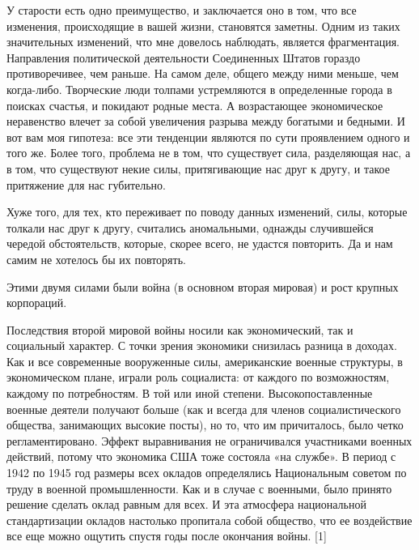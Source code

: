 \documentclass[ebook,12pt,oneside,openany]{memoir}
\begin{document}
\maketitle

У старости есть одно преимущество, и заключается оно в том, что все
изменения, происходящие в вашей жизни, становятся заметны. Одним из
таких значительных изменений, что мне довелось наблюдать, является
фрагментация. Направления политической деятельности Соединенных Штатов
гораздо противоречивее, чем раньше. На самом деле, общего между ними
меньше, чем когда-либо. Творческие люди толпами устремляются в
определенные города в поисках счастья, и покидают родные места. А
возрастающее экономическое неравенство влечет за собой увеличения
разрыва между богатыми и бедными. И вот вам моя гипотеза: все эти
тенденции являются по сути проявлением одного и того же. Более того,
проблема не в том, что существует сила, разделяющая нас, а в том, что
существуют некие силы, притягивающие нас друг к другу, и такое
притяжение для нас губительно. \newline

Хуже того, для тех, кто переживает по поводу данных изменений, силы,
которые толкали нас друг к другу, считались аномальными, однажды
случившейся чередой обстоятельств, которые, скорее всего, не удастся
повторить. Да и нам самим не хотелось бы их повторять. \newline

Этими двумя силами были война (в основном вторая мировая) и рост
крупных корпораций. \newline

Последствия второй мировой войны носили как экономический, так и
социальный характер. С точки зрения экономики снизилась разница в
доходах. Как и все современные вооруженные силы, американские военные
структуры, в экономическом плане, играли роль социалиста: от каждого
по возможностям, каждому по потребностям. В той или иной степени.
Высокопоставленные военные деятели получают больше (как и всегда для
членов социалистического общества, занимающих высокие посты), но то,
что им причиталось, было четко регламентировано. Эффект выравнивания
не ограничивался участниками военных действий, потому что экономика
США тоже состояла «на службе». В период с 1942 по 1945 год размеры
всех окладов определялись Национальным советом по труду в военной
промышленности. Как и в случае с военными, было принято решение
сделать оклад равным для всех. И эта атмосфера национальной
стандартизации окладов настолько пропитала собой общество, что ее
воздействие все еще можно ощутить спустя годы после окончания войны.
[1] \newline
\end{document}
